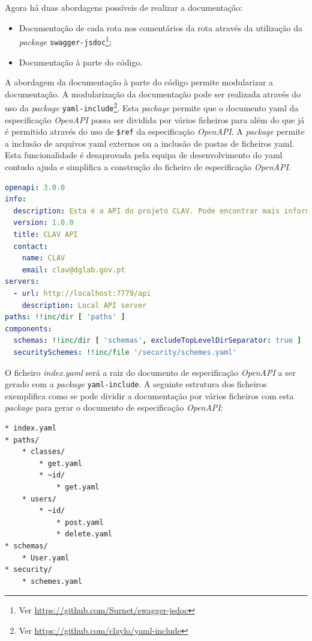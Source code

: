 Agora há duas abordagens possíveis de realizar a documentação:
\begin{itemize}
    \item Documentação de cada rota nos comentários da rota através da utilização da 
    \textit{package} \texttt{swagger-jsdoc}\footnote{Ver \url{https://github.com/Surnet/swagger-jsdoc}};
    \item Documentação à parte do código.
\end{itemize}

A abordagem da documentação à parte do código permite modularizar a documentação. A modularização da documentação 
pode ser realizada através do uso da \textit{package} \texttt{yaml-include}\footnote{Ver \url{https://github.com/claylo/yaml-include}}. Esta \textit{package} permite que o documento \acrshort{yaml} da especificação \textit{OpenAPI} possa ser dividida por vários ficheiros para além do que já é permitido através do uso de \verb|$ref| da especificação \textit{OpenAPI}. A \textit{package} permite a inclusão de arquivos \acrshort{yaml} externos ou a inclusão de pastas de ficheiros \acrshort{yaml}. Esta funcionalidade é desaprovada pela equipa de desenvolvimento do \acrshort{yaml} contudo ajuda e simplifica a construção do ficheiro de especificação \textit{OpenAPI}.

\begin{lstlisting}[language=yaml, caption=Exemplo de uso do \texttt{yaml-include} no documento de especificação \textit{OpenAPI}(\textit{index.yaml}), label=exem:yamli]
openapi: 3.0.0
info:
  description: Esta é a API do projeto CLAV. Pode encontrar mais informação sobre o CLAV em [http://clav.dglab.gov.pt](http://clav.dglab.gov.pt).
  version: 1.0.0
  title: CLAV API
  contact:
    name: CLAV
    email: clav@dglab.gov.pt
servers:
  - url: http://localhost:7779/api
    description: Local API server
paths: !!inc/dir [ 'paths' ]
components:
  schemas: !!inc/dir [ 'schemas', excludeTopLevelDirSeparator: true ]
  securitySchemes: !!inc/file '/security/schemes.yaml'
\end{lstlisting}

O ficheiro \textit{index.yaml} será a raiz do documento de especificação \textit{OpenAPI} a ser gerado com 
a \textit{package} \texttt{yaml-include}. A seguinte estrutura dos ficheiros exemplifica como se pode dividir a 
documentação por vários ficheiros com esta \textit{package} para gerar o documento de especificação \textit{OpenAPI}:
\begin{lstlisting}[language=pseudocode, caption=Exemplo de estrutura dos ficheiros para gerar o documento de especificação \textit{OpenAPI}, label=exem:faf]
* index.yaml
* paths/
    * classes/
        * get.yaml
        * ~id/
            * get.yaml
    * users/
        * ~id/
            * post.yaml
            * delete.yaml
* schemas/
    * User.yaml
* security/
    * schemes.yaml
\end{lstlisting}

